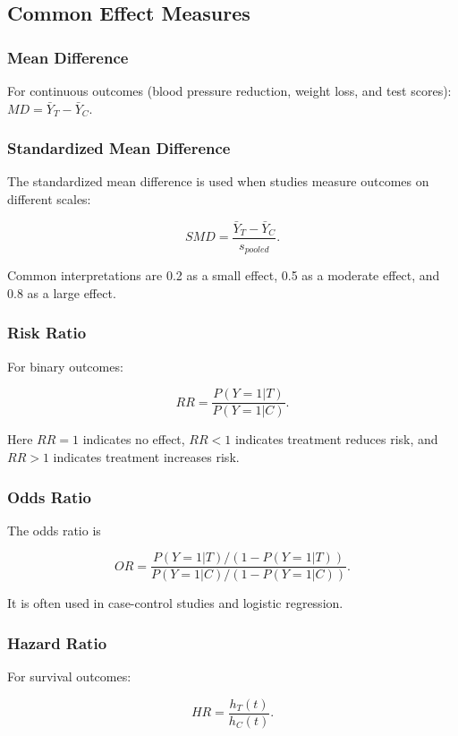 \documentclass[11pt]{article}
\begin{document}
\subsection*{Common Effect Measures}

\subsubsection*{Mean Difference}

For continuous outcomes (blood pressure reduction, weight loss, and test scores): $MD=\bar{Y}_T-\bar{Y}_C$.

\subsubsection*{Standardized Mean Difference}

The standardized mean difference is used when studies measure outcomes on different scales:

\[SMD=\frac{\bar{Y}_T-\bar{Y}_C}{s_{pooled}}.\]

Common interpretations are 0.2 as a small effect, 0.5 as a moderate effect, and 0.8 as a large effect.

\subsubsection*{Risk Ratio}

For binary outcomes:

\[RR=\frac{P(Y=1|T)}{P(Y=1|C)}.\]

Here $RR=1$ indicates no effect, $RR<1$ indicates treatment reduces risk, and $RR>1$ indicates treatment increases risk.

\subsubsection*{Odds Ratio}

The odds ratio is

\[OR=\frac{P(Y=1|T)/(1-P(Y=1|T))}{P(Y=1|C)/(1-P(Y=1|C))}.\]

It is often used in case-control studies and logistic regression.

\subsubsection*{Hazard Ratio}

For survival outcomes:

\[HR=\frac{h_T(t)}{h_C(t)}.\]
\end{document}
